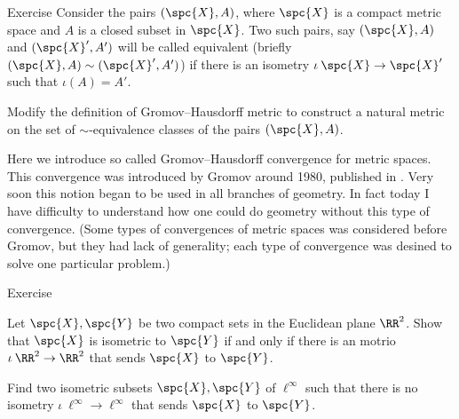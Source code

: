 \begin{thm}{Exercise}\label{pr:GH-variation}
Consider the pairs $(\spc{X},A)$, where $\spc{X}$ is a compact metric space and $A$ is a closed subset in $\spc{X}$.
Two such pairs, say $(\spc{X},A)$ and $(\spc{X}',A')$ will be called equivalent (briefly $(\spc{X},A)\sim(\spc{X}',A')$)
if there is an isometry $\iota\:\spc{X}\to \spc{X}'$ such that $\iota(A)=A'$.

Modify the definition of Gromov--Hausdorff metric to construct a natural metric on the set of $\sim$-equivalence classes of the pairs $(\spc{X},A)$.
\end{thm}

Here we introduce so called Gromov--Hausdorff convergence for metric spaces.
This convergence was introduced by Gromov around 1980, published in \cite{gromov-polynomial-growth}.
Very soon this notion began to be used in all branches of geometry.
In fact today I have difficulty to understand 
how one could do geometry without this type of convergence.%
(Some types of convergences of metric spaces was considered before Gromov,
but they had lack of generality;
each type of convergence was desined to solve one particular problem.)


\begin{thm}{Exercise}\label{ex:euclid-isom}
\begin{subthm}{}
Let $\spc{X},\spc{Y}$ be two compact sets in the Euclidean plane $\RR^2$.
Show that $\spc{X}$ is isometric to $\spc{Y}$ if and only if there is an motrio $\iota\:\RR^2\to \RR^2$
that sends $\spc{X}$ to $\spc{Y}$.
\end{subthm}

\begin{subthm}{}
Find two isometric subsets $\spc{X},\spc{Y}$ of $\ell^\infty$
such that there is no isometry $\iota\:\ell^\infty\to \ell^\infty$ 
that sends $\spc{X}$ to $\spc{Y}$.
\end{subthm}
\end{thm}

